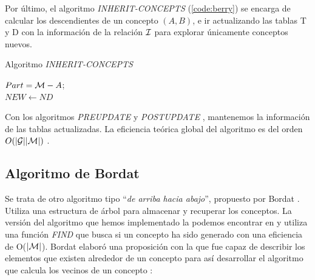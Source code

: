 \documentclass[oneside,openright,titlepage,numbers=noenddot,openany,headinclude,footinclude=true,
cleardoublepage=empty,abstractoff,BCOR=5mm,paper=a4,fontsize=12pt,main=spanish]{scrreprt}
\begin{document}
Por último, el algoritmo \textit{INHERIT-CONCEPTS} (\ref{code:berry}) \cite{berry} se encarga de calcular los descendientes de un concepto $(A,B)$, e ir actualizando las tablas T y D con la información de la relación $\mathcal{I}$ para explorar únicamente conceptos nuevos.

\begin{algorithm}[H]
\caption{Algoritmo \textit{INHERIT-CONCEPTS}}
\label{code:berry}
     $ Part = \mathcal{M} - A$;\\
     $NEW \leftarrow ND$

\end{algorithm}

Con los algoritmos \textit{PREUPDATE} \cite{berry} y \textit{POSTUPDATE} \cite{berry}, mantenemos la información de las tablas actualizadas. La eficiencia teórica global del algoritmo es del orden $O(|\mathcal{G}||\mathcal{M}|)$ \cite{berry}.


\subsection{Algoritmo de Bordat}
\label{alg:bordat}

Se trata de otro algoritmo tipo ``\textit{de arriba hacia abajo}'', propuesto por Bordat \cite{bordat_calcul_nodate}. Utiliza una estructura de árbol para almacenar y recuperar los conceptos. La versión del algoritmo que hemos implementado la podemos encontrar en \cite{comparingperformance} y utiliza una función \textit{FIND} que busca si un concepto ha sido generado con una eficiencia de O($|\mathcal{M}|$). Bordat elaboró una proposición con la que fue capaz de describir los elementos que existen alrededor de un concepto para así desarrollar el algoritmo que calcula los vecinos de un concepto \cite{bordat_calcul_nodate}:
\end{document}
